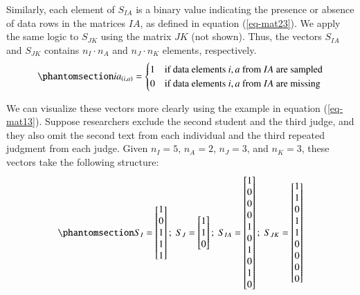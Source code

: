 \documentclass[
  authoryear,
  review,
  1p]{elsarticle}
\begin{document}
Similarly, each element of \(S_{IA}\) is a binary value indicating the
presence or absence of data rows in the matrices \(IA\), as defined in
equation (\ref{eq-mat23}). We apply the same logic to \(S_{JK}\) using
the matrix \(JK\) (not shown). Thus, the vectors \(S_{IA}\) and
\(S_{JK}\) contains \(n_{I} \cdot n_{A}\) and \(n_{J} \cdot n_{K}\)
elements, respectively. \begin{equation}\phantomsection\label{eq-mat23}{
ia_{(i,a)} = \begin{cases} 
1 & \text{if data elements } i,a \text{ from } IA \text{ are sampled} \\
0 & \text{if data elements } i,a \text{ from } IA \text{ are missing}
\end{cases}
}\end{equation}

We can visualize these vectors more clearly using the example in
equation (\ref{eq-mat13}). Suppose researchers exclude the second
student and the third judge, and they also omit the second text from
each individual and the third repeated judgment from each judge. Given
\(n_{I} = 5\), \(n_{A} = 2\), \(n_{J} = 3\), and \(n_{K} = 3\), these
vectors take the following structure:
\begin{equation}\phantomsection\label{eq-mat24}{
S_{I} = \begin{bmatrix}
1 \\
0 \\
1 \\
1 \\
1
\end{bmatrix} ; \;
S_{J} = \begin{bmatrix}
1 \\
1 \\
0
\end{bmatrix} ; \;
S_{IA} = \begin{bmatrix}
1 \\
0 \\
0 \\
0 \\
1 \\
0 \\
1 \\
0 \\
1 \\
0 
\end{bmatrix} ; \;
S_{JK} = \begin{bmatrix}
1 \\
1 \\
0 \\
1 \\
1 \\
0 \\
0 \\
0 \\
0 
\end{bmatrix}
}\end{equation}
\end{document}
